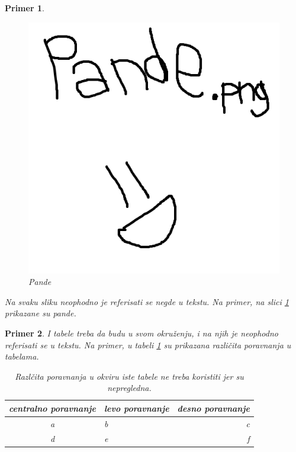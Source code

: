 \documentclass[a4paper]{article}
\newtheorem{primer}{Primer}[subsection]
\begin{document}
{\begin{primer}
\begin{figure}[h!]
\begin{center}
\includegraphics[scale=0.2]{pande.png}
\end{center}
\caption{Pande}
\label{fig:pande}
\end{figure}

Na svaku sliku neophodno je referisati se negde u tekstu. Na primer, na slici \ref{fig:pande} prikazane su pande. 
\end{primer}

\begin{primer} I tabele treba da budu u svom okruženju, i na njih je neophodno referisati se u tekstu. Na primer, u tabeli \ref{tab:tabela1} su prikazana različita poravnanja u tabelama.

\begin{table}[h!]
\begin{center}
\caption{Razlčita poravnanja u okviru iste tabele ne treba koristiti jer su nepregledna.}
\begin{tabular}{|c|l|r|} \hline
centralno poravnanje& levo poravnanje& desno poravnanje\\ \hline
a &b&c\\ \hline
d &e&f\\ \hline
\end{tabular}
\label{tab:tabela1}
\end{center}
\end{table}


\end{primer}}
\end{document}
